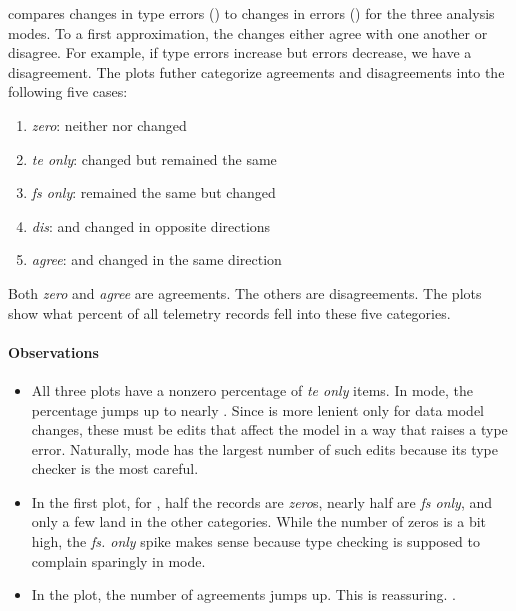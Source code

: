 \documentclass[english,submission,cleveref]{programming}
\begin{document}
 compares changes in type errors (\tekey{}) to changes in
\FS{} errors (\fskey{}) for the three analysis modes.
To a first approximation, the changes either agree with one another
or disagree.
For example, if type errors increase but \FS{} errors decrease,
we have a disagreement.
The plots futher categorize agreements and disagreements into
the following five cases:
\begin{enumerate}
  \item
    \emph{zero}: neither \tekey{} nor \fskey{} changed
  \item
    \emph{te only}: \tekey{} changed but \fskey{} remained the same
  \item 
    \emph{fs only}: \tekey{} remained the same but \fskey{} changed
  \item
    \emph{dis}: \tekey{} and \fskey{} changed in opposite directions
  \item 
    \emph{agree}: \tekey{} and \fskey{} changed in the same direction
\end{enumerate}
Both \emph{zero} and \emph{agree} are agreements.
The others are disagreements.
The plots show what percent of all telemetry records fell into these five categories.

\paragraph{Observations}

\begin{itemize}
  \item
    All three plots have a nonzero percentage of \emph{te only} items.
    In \mstrict{} mode, the percentage jumps up to nearly .
    Since \fskey{} is more lenient only for data model changes, these must
    be edits that affect the model in a way that raises a type error.
    Naturally, \mstrict{} mode has the largest number of such edits because
    its type checker is the most careful.

  \item
    In the first plot, for \mnocheck{},
    half the records are \emph{zero\/}s, nearly half are \emph{fs only}, and only a few
    land in the other categories.
    While the number of zeros is a bit high,
    the \emph{fs. only} spike makes sense because type checking is supposed to complain
    sparingly in \mnocheck{} mode.

  \item
    In the \mnonstrict{} plot, the number of agreements jumps up.
    This is reassuring.
    \FILL{}.

\end{itemize}
\end{document}
